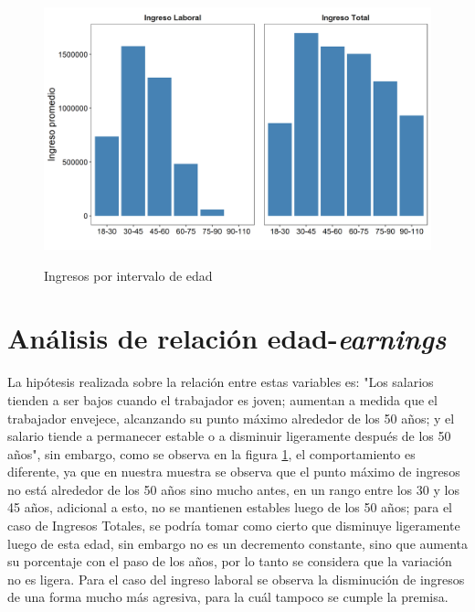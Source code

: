\documentclass[11pt,a4paper]{article}
\begin{document}
\begin{figure}[H]
    \centering
        \caption{Ingresos por intervalo de edad}
    \includegraphics[width=\textwidth]{../views/ingresos_edad.png}
    \label{fig:ingresos_edad}
\end{figure}

\section{Análisis de relación edad-\emph{earnings}}

La hipótesis realizada sobre la relación entre estas variables es: "Los salarios tienden a ser bajos cuando el trabajador es joven; aumentan a medida que el trabajador envejece, alcanzando su punto máximo alrededor de los 50 años; y el salario tiende a permanecer estable o a disminuir ligeramente después de los 50 años", sin embargo, como se observa en la figura  \ref{fig:ingresos_edad}, el comportamiento es diferente, ya que en nuestra muestra se observa que el punto máximo de ingresos no está alrededor de los 50 años sino mucho antes, en un rango entre los 30 y los 45 años, adicional a esto, no se mantienen estables luego de los 50 años; para el caso de Ingresos Totales, se podría tomar como cierto que disminuye ligeramente luego de esta edad, sin embargo no es un decremento constante, sino que aumenta su porcentaje con el paso de los años, por lo tanto se considera que la variación no es ligera. Para el caso del ingreso laboral se observa la disminución de ingresos de una forma mucho más agresiva, para la cuál tampoco se cumple la premisa.
\end{document}
